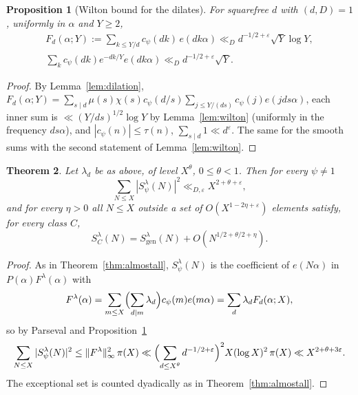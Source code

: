 \documentclass[11pt]{amsart}
\newtheorem{theorem}{Theorem}[section]
\newtheorem{proposition}[theorem]{Proposition}
\theoremstyle{remark}
\newcommand{\gen}{\mathrm{gen}}
\newcommand{\e}{\varepsilon}
\begin{document}
\begin{proposition}[Wilton bound for the dilates]\label{prop:wiltond}
For squarefree $d$ with $(d,D)=1$, uniformly in $\alpha$ and $Y\ge2$,
\begin{gather*}
F_d(\alpha;Y):=\sum_{k\le Y/d}c_\psi(dk)\,e(dk\alpha)\ll_D d^{-1/2+\e}\sqrt Y\log Y,\\
\sum_{k}c_\psi(dk)e^{-dk/Y}e(dk\alpha)\ll_Dd^{-1/2+\e}\sqrt Y .
\end{gather*}
\end{proposition}
\begin{proof}
By Lemma~\ref{lem:dilation}, $F_d(\alpha;Y)=\sum_{s\mid d}\mu(s)\chi(s)c_\psi(d/s)\sum_{j\le Y/(ds)}c_\psi(j)e(jds\alpha)$, each inner sum is $\ll(Y/ds)^{1/2}\log Y$ by Lemma~\ref{lem:wilton} (uniformly in the frequency $ds\alpha$), and $|c_\psi(n)|\le\tau(n)$, $\sum_{s\mid d}1\ll d^\e$. The same for the smooth sums with the second statement of Lemma~\ref{lem:wilton}.
\end{proof}

\begin{theorem}\label{thm:sifted}
Let $\lambda_d$ be as above, of level $X^\theta$, $0\le\theta<1$. Then for every $\psi\ne1$
\[
\sum_{N\le X}|S^\lambda_\psi(N)|^2\ll_{D,\e}X^{2+\theta+\e},
\]
and for every $\eta>0$ all $N\le X$ outside a set of $O(X^{1-2\eta+\e})$ elements satisfy, for every class $C$,
\[
S^\lambda_C(N)=S^\lambda_\gen(N)+O(N^{1/2+\theta/2+\eta}).
\]
\end{theorem}
\begin{proof}
As in Theorem~\ref{thm:almostall}, $S^\lambda_\psi(N)$ is the coefficient of $e(N\alpha)$ in $P(\alpha)F^\lambda(\alpha)$ with
\[
F^\lambda(\alpha)=\sum_{m\le X}\Bigl(\sum_{d\mid m}\lambda_d\Bigr)c_\psi(m)e(m\alpha)=\sum_d\lambda_dF_d(\alpha;X),
\]
so by Parseval and Proposition~\ref{prop:wiltond}
\[
\sum_{N\le X}|S^\lambda_\psi(N)|^2\le\|F^\lambda\|_\infty^2\,\pi(X)\ll\Bigl(\sum_{d\le X^\theta}d^{-1/2+\e}\Bigr)^2X(\log X)^2\,\pi(X)\ll X^{2+\theta+3\e}.
\]
The exceptional set is counted dyadically as in Theorem~\ref{thm:almostall}.
\end{proof}
\end{document}
